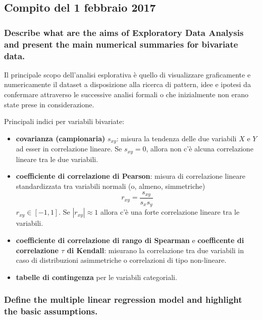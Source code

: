 \documentclass[
]{article}
\author{}
\date{\vspace{-2.5em}}
\begin{document}
\hypertarget{compito-del-1-febbraio-2017}{%
\subsection{Compito del 1 febbraio
2017}\label{compito-del-1-febbraio-2017}}

\hypertarget{describe-what-are-the-aims-of-exploratory-data-analysis-and-present-the-main-numerical-summaries-for-bivariate-data.}{%
\subsubsection{Describe what are the aims of Exploratory Data Analysis
and present the main numerical summaries for bivariate
data.}\label{describe-what-are-the-aims-of-exploratory-data-analysis-and-present-the-main-numerical-summaries-for-bivariate-data.}}

Il principale scopo dell'analisi esplorativa è quello di visualizzare
graficamente e numericamente il dataset a disposizione alla ricerca di
pattern, idee e ipotesi da confermare attraverso le successive analisi
formali o che inizialmente non erano state prese in considerazione.

Principali indici per variabili bivariate:

\begin{itemize}
\item
  \textbf{covarianza (campionaria)} \(s_{xy}\): misura la tendenza delle
  due variabili \(X\) e \(Y\) ad esser in correlazione lineare. Se
  \(s_{xy} = 0\), allora non c'è alcuna correlazione lineare tra le due
  variabili.
\item
  \textbf{coefficiente di correlazione di Pearson}: misura di
  correlazione lineare standardizzata tra variabili normali (o, almeno,
  simmetriche) \[ r_{xy} = \frac{s_{xy}}{s_x s_y} \]
  \(r_{xy} \in [-1, 1]\). Se \(|r_{xy}| \approx 1\) allora c'è una forte
  correlazione lineare tra le variabili.
\item
  \textbf{coefficiente di correlazione di rango di Spearman} e
  \textbf{coefficente di correlazione \(\tau\) di Kendall}: misurano la
  correlazione tra due variabili in caso di distribuzioni asimmetriche o
  correlazioni di tipo non-lineare.
\item
  \textbf{tabelle di contingenza} per le variabili categoriali.
\end{itemize}

\hypertarget{define-the-multiple-linear-regression-model-and-highlight-the-basic-assumptions.}{%
\subsubsection{Define the multiple linear regression model and highlight
the basic
assumptions.}\label{define-the-multiple-linear-regression-model-and-highlight-the-basic-assumptions.}}
\end{document}
